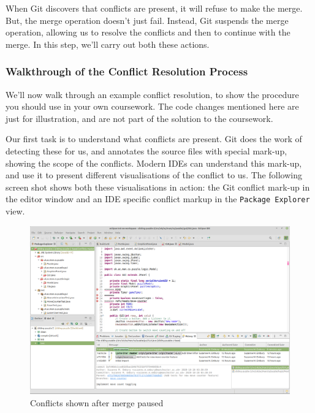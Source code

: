 \documentclass[
]{book}
\begin{document}
When Git discovers that conflicts are present, it will refuse to make the merge. But, the merge operation doesn't just fail. Instead, Git suspends the merge operation, allowing us to resolve the conflicts and then to continue with the merge. In this step, we'll carry out both these actions.

\hypertarget{walkthrough}{%
\subsubsection{Walkthrough of the Conflict Resolution Process}\label{walkthrough}}

We'll now walk through an example conflict resolution, to show the procedure you should use in your own coursework. The code changes mentioned here are just for illustration, and are not part of the solution to the coursework.

Our first task is to understand what conflicts are present. Git does the work of detecting these for us, and annotates the source files with special mark-up, showing the scope of the conflicts. Modern IDEs can understand this mark-up, and use it to present different visualisations of the conflict to us. The following screen shot shows both these visualisations in action: the Git conflict mark-up in the editor window and an IDE specific conflict markup in the \texttt{Package\ Explorer} view.

\begin{figure}

{\centering \includegraphics[width=1\linewidth]{images/conflictsShownAfterMergePaused} 

}

\caption{Conflicts shown after merge paused}\label{fig:conflictsShownAfterMergePaused-fig}
\end{figure}
\end{document}
